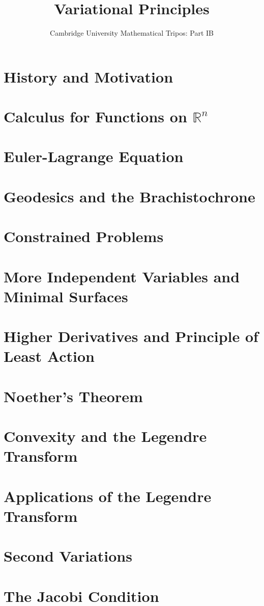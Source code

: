 \documentclass{article}
\title{Variational Principles}
\author{Cambridge University Mathematical Tripos: Part IB}
\begin{document}
\maketitle

\tableofcontentsnewpage{}

\section{History and Motivation}

\section{Calculus for Functions on \(\mathbb R^n\)}

\section{Euler-Lagrange Equation}

\section{Geodesics and the Brachistochrone}

\section{Constrained Problems}

\section{More Independent Variables and Minimal Surfaces}

\section{Higher Derivatives and Principle of Least Action}

\section{Noether's Theorem}

\section{Convexity and the Legendre Transform}

\section{Applications of the Legendre Transform}

\section{Second Variations}

\section{The Jacobi Condition}

\end{document}
